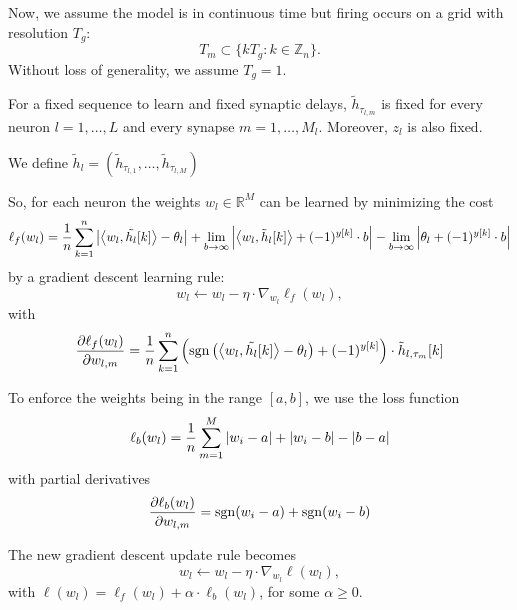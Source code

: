 \documentclass{article}
\begin{document}
  Now, we assume the model is in continuous time but firing occurs on a grid with resolution $T_g$:
  \begin{equation}
    T_m \subset \{k T_g : k \in \mathbb{Z}_n\}.
  \end{equation}
  Without loss of generality, we assume $T_g = 1$.


  For a fixed sequence to learn and fixed synaptic delays, $\tilde{h}_{\tau_{l,m}}$ is fixed for every neuron $l = 1, \dots, L$ 
  and every synapse $m = 1, \dots, M_l$. Moreover, $z_l$ is also fixed. 

  We define $\tilde{h}_l = \left(\tilde{h}_{\tau_{l,1}}, \dots, \tilde{h}_{\tau_{l,M}}\right)$ 

  So, for each neuron the weights $w_l \in \mathbb{R}^M$ can be learned by minimizing the cost 
  \begin{equation}
    \ell_f(w_l) = \frac{1}{n} \sum_{k=1}^n \left|\left\langle{w_l},{\tilde{h_l}[k]}\right\rangle - \theta_l\right| 
    + \lim_{b \to \infty} \left| \left\langle{w_l},{\tilde{h}_l[k]}\right\rangle + (-1)^{y[k]}\cdot b\right|
    - \lim_{b \to \infty} \left|\theta_l + (-1)^{y[k]} \cdot b\right|
  \end{equation}
  by a gradient descent learning rule:
  \begin{equation}
    w_l \leftarrow w_l - \eta \cdot \nabla_{w_l} \ell_f (w_l),
  \end{equation}
  with 
  \begin{equation}
    \frac{\partial \ell_f (w_l)}{\partial w_{l, m}} = \frac{1}{n} \sum_{k=1}^n \left(\operatorname{sgn}\left(\left\langle{w_l},{\tilde{h_l}[k]}\right\rangle - \theta_l\right) + (-1)^{y[k]}\right) \cdot \tilde{h}_{l, \tau_m}[k]
  \end{equation}

  To enforce the weights being in the range $[a, b]$, we use the loss function 
  \begin{equation}
    \ell_b(w_l) = \frac{1}{n} \sum_{m=1}^M \left|w_i - a\right| + \left|w_i - b\right| - \left|b-a\right|
  \end{equation}
  with partial derivatives
  \begin{equation}
    \frac{\partial \ell_b (w_l)}{\partial w_{l, m}} = \operatorname{sgn}(w_i - a) + \operatorname{sgn}(w_i - b)
  \end{equation}

  The new gradient descent update rule becomes 
  \begin{equation}
    w_l \leftarrow w_l - \eta \cdot \nabla_{w_l} \ell (w_l),
  \end{equation}
  with $\ell (w_l) = \ell_f(w_l) + \alpha \cdot \ell_b(w_l)$, for some $\alpha \geq 0$.
\end{document}
